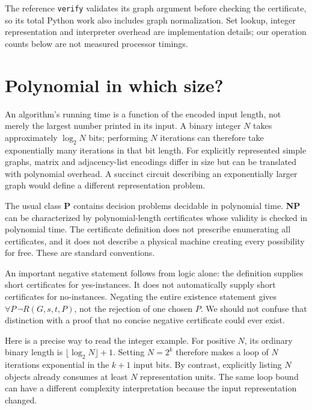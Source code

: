 The reference \texttt{verify} validates its graph argument before
checking the certificate, so its total Python work also includes graph
normalization. Set lookup, integer representation and interpreter
overhead are implementation details; our operation counts below are not
measured processor timings.

\section{Polynomial in which size?}\label{polynomial-in-which-size}

An algorithm's running time is a function of the encoded input length,
not merely the largest number printed in its input. A binary integer
\(N\) takes approximately \(\log_2 N\) bits; performing \(N\) iterations
can therefore take exponentially many iterations in that bit length. For
explicitly represented simple graphs, matrix and adjacency-list
encodings differ in size but can be translated with polynomial overhead.
A succinct circuit describing an exponentially larger graph would define
a different representation problem.

The usual class \textbf{P} contains decision problems decidable in
polynomial time. \textbf{NP} can be characterized by polynomial-length
certificates whose validity is checked in polynomial time. The
certificate definition does not prescribe enumerating all certificates,
and it does not describe a physical machine creating every possibility
for free. These are standard conventions.\cite{Sipser2013,SipserLecture14}

An important negative statement follows from logic alone: the definition
supplies short certificates for yes-instances. It does not automatically
supply short certificates for no-instances. Negating the entire
existence statement gives \(\forall P\,\neg R(G,s,t,P)\), not the
rejection of one chosen \(P\). We should not confuse that distinction
with a proof that no concise negative certificate could ever exist.


Here is a precise way to read the integer example. For positive \(N\),
its ordinary binary length is \(\lfloor\log_2 N\rfloor+1\). Setting
\(N=2^k\) therefore makes a loop of \(N\) iterations exponential in the
\(k+1\) input bits. By contrast, explicitly listing \(N\) objects
already consumes at least \(N\) representation units. The same loop
bound can have a different complexity interpretation because the input
representation changed.

